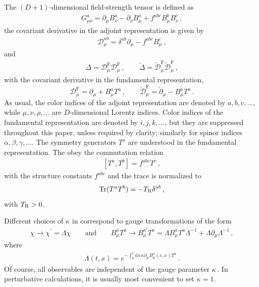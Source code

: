 The $(D+1)$-dimensional field-strength tensor is defined as
\begin{align}
  G_{\mu\nu}^a = \partial_\mu B_\nu^a - \partial_\nu B_\mu^a + f^{abc}
  B_\mu^b B_\nu^c\,,
\end{align}
the covariant derivative in the adjoint representation is given by
\begin{align}
  \mathcal{D}_\mu^{ab} = \delta^{ab} \partial_\mu - f^{abc} B_\mu^c\,,
\end{align}
and
\begin{equation}
  \begin{split}
    \Delta = \mathcal{D}^\mathrm{F}_\mu \mathcal{D}^\mathrm{F}_\mu
    \,,\qquad
    \overleftarrow{\Delta} = \overleftarrow{\mathcal{D}}^\mathrm{F}_\mu
    \overleftarrow{\mathcal{D}}^\mathrm{F}_\mu \,,
  \end{split}
\end{equation}
with the covariant derivative in the fundamental representation,
\begin{equation}
  \mathcal{D}^\mathrm{F}_\mu = \partial_\mu + B^a_\mu T^a \,,\qquad
  \overleftarrow{\mathcal{D}}^\mathrm{F}_\mu =
    \overleftarrow{\partial}_\mu - B^a_\mu T^a \,.
\end{equation}
As usual, the color indices of the adjoint representation are denoted by
$a,b,c,\ldots$, while $\mu,\nu,\rho,\ldots$ are $D$-dimensional Lorentz
indices. Color indices of the fundamental representation are denoted by
$i,j,k,\ldots$, but they are suppressed throughout this paper, unless
required by clarity; similarly for spinor indices
$\alpha,\beta,\gamma,\ldots$. The symmetry generators $T^a$ are understood in
the fundamental representation. The obey the commutation relation
\begin{equation}
  \begin{split}
    [T^a,T^b] = f^{abc}T^c\,,
  \end{split}
\end{equation}
with the structure constants $f^{abc}$ and the trace is normalized to
\begin{equation}
  \mathrm{Tr}(T^a T^b) = - T_\mathrm{R} \delta^{ab} \, ,
\end{equation}
with $T_\mathrm{R} > 0$.

Different choices of $\kappa$ in  correspond to gauge
transformations of the form
\begin{align}
  \chi \rightarrow \chi^\prime = \Lambda \chi \quad \quad \text{and}
  \quad \quad B_\mu^a T^a \rightarrow B_\mu^{a\prime} T^a= \Lambda
  B_\mu^a T^a \Lambda^{-1} + \Lambda \partial_\mu \Lambda^{-1}\,,
\end{align}
where
\begin{align}
  \Lambda(t,x)=e^{-\int_0^t \mathrm{d}s \, \kappa \partial_\mu B_\mu^a(s,x) T^a}\,.
\end{align}
Of course, all observables are independent of the gauge parameter
$\kappa$\,\cite{Luscher:2010iy}.  In perturbative calculations, it is
usually most convenient to set $\kappa = 1$.

